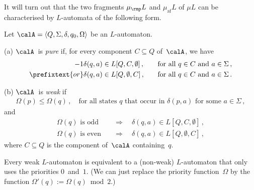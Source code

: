 \documentclass[10pt, fleqn]{scrartcl}
\newcommand*{\muaf}{\mu_{\mathrm{af}}}
\newcommand*{\mup}{\mu_\rmp}
\newcommand*{\?}{\kern .08em}
\begin{document}
It will turn out that the two fragments $\mup L$ and $\muaf L$ of $\mu L$ can be characterised
by $L$-automata of the following form.
\begin{Def}
Let $\calA = \langle Q,\Sigma,\delta,q_0,\Omega\rangle$ be an $L$-automaton.

(a) $\calA$~is \emph{pure} if, for every component $C \subseteq Q$ of~$\calA$, we have
\begin{alignat*}{-1}
  \delta(q,a) &\in L[Q,C,\emptyset]\,, &&\quad\text{for all } q \in C \text{ and } a \in \Sigma\,, \\
\prefixtext{or}
  \delta(q,a) &\in L[Q,\emptyset,C]\,, &&\quad\text{for all } q \in C \text{ and } a \in \Sigma\,.
\end{alignat*}

(b) $\calA$~is \emph{weak} if
\begin{align*}
  \Omega(p) \leq \Omega(q)\,, \quad\text{for all states } q \text{ that occur in }
    \delta(p,a) \text{ for some } a \in \Sigma\,,
\end{align*}
and
\begin{align*}
  \Omega(q) \text{ is odd}  &\quad\Rightarrow\quad \delta(q,a) \in L[Q,C,\emptyset]\,, \\
  \Omega(q) \text{ is even} &\quad\Rightarrow\quad \delta(q,a) \in L[Q,\emptyset,C]\,,
\end{align*}
where $C \subseteq Q$ is the component of~$\calA$ containing~$q$.
\end{Def}
\begin{Rem}
Every weak $L$-automaton is equivalent to a (non-weak) $L$-automaton that
only uses the priorities $0$~and~$1$. (We can just replace the priority function~$\Omega$ by
the function $\Omega'(q) := \Omega(q) \bmod 2$.)
\end{Rem}
\end{document}
